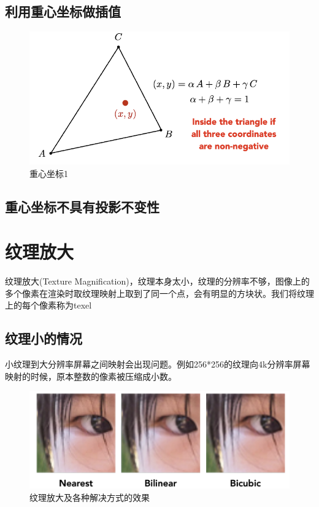 \subsection*{利用重心坐标做插值}

\begin{figure}[H]
    \centering
    \includegraphics[scale=0.4]{figures/重心坐标1.png}
    \caption{重心坐标1}
\end{figure}

\subsection*{重心坐标不具有投影不变性}

\section{纹理放大}
纹理放大(Texture Magnification)，纹理本身太小，纹理的分辨率不够，图像上的多个像素在渲染时取纹理映射上取到了同一个点，会有明显的方块状。我们将纹理上的每个像素称为texel

\subsection*{纹理小的情况}

小纹理到大分辨率屏幕之间映射会出现问题。例如256*256的纹理向4k分辨率屏幕映射的时候，原本整数的像素被压缩成小数。

\begin{figure}[H]
    \centering
    \includegraphics[scale=0.4]{figures/纹理放大.png}
    \caption{纹理放大及各种解决方式的效果}
\end{figure}

